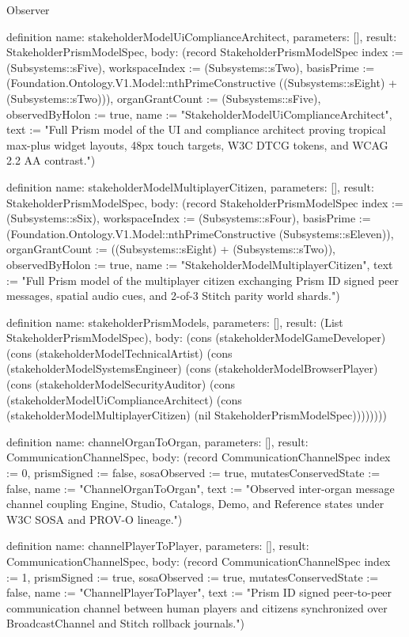 \begin{lexlean}{Observer}
\begin{semanticmodule}
definition{
  name: stakeholderModelUiComplianceArchitect,
  parameters: [],
  result: StakeholderPrismModelSpec,
  body: (record StakeholderPrismModelSpec {index := (Subsystems::sFive), workspaceIndex := (Subsystems::sTwo), basisPrime := (Foundation.Ontology.V1.Model::nthPrimeConstructive ((Subsystems::sEight) + (Subsystems::sTwo))), organGrantCount := (Subsystems::sFive), observedByHolon := true, name := "StakeholderModelUiComplianceArchitect", text := "Full Prism model of the UI and compliance architect proving tropical max-plus widget layouts, 48px touch targets, W3C DTCG tokens, and WCAG 2.2 AA contrast."})
}

definition{
  name: stakeholderModelMultiplayerCitizen,
  parameters: [],
  result: StakeholderPrismModelSpec,
  body: (record StakeholderPrismModelSpec {index := (Subsystems::sSix), workspaceIndex := (Subsystems::sFour), basisPrime := (Foundation.Ontology.V1.Model::nthPrimeConstructive (Subsystems::sEleven)), organGrantCount := ((Subsystems::sEight) + (Subsystems::sTwo)), observedByHolon := true, name := "StakeholderModelMultiplayerCitizen", text := "Full Prism model of the multiplayer citizen exchanging Prism ID signed peer messages, spatial audio cues, and 2-of-3 Stitch parity world shards."})
}

definition{
  name: stakeholderPrismModels,
  parameters: [],
  result: (List StakeholderPrismModelSpec),
  body: (cons (stakeholderModelGameDeveloper) (cons (stakeholderModelTechnicalArtist) (cons (stakeholderModelSystemsEngineer) (cons (stakeholderModelBrowserPlayer) (cons (stakeholderModelSecurityAuditor) (cons (stakeholderModelUiComplianceArchitect) (cons (stakeholderModelMultiplayerCitizen) (nil StakeholderPrismModelSpec))))))))
}

definition{
  name: channelOrganToOrgan,
  parameters: [],
  result: CommunicationChannelSpec,
  body: (record CommunicationChannelSpec {index := 0, prismSigned := false, sosaObserved := true, mutatesConservedState := false, name := "ChannelOrganToOrgan", text := "Observed inter-organ message channel coupling Engine, Studio, Catalogs, Demo, and Reference states under W3C SOSA and PROV-O lineage."})
}

definition{
  name: channelPlayerToPlayer,
  parameters: [],
  result: CommunicationChannelSpec,
  body: (record CommunicationChannelSpec {index := 1, prismSigned := true, sosaObserved := true, mutatesConservedState := false, name := "ChannelPlayerToPlayer", text := "Prism ID signed peer-to-peer communication channel between human players and citizens synchronized over BroadcastChannel and Stitch rollback journals."})
}


\end{semanticmodule}
\end{lexlean}
